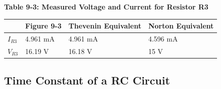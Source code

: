 \documentclass[a4paper]{article}
\begin{document}
\begin{center}
    \small\textbf{Table 9-3: Measured Voltage and Current for Resistor R3}
    \begin{tabular}{|p{3 cm}|p{3 cm}|p{3 cm}|p{3 cm}|}
        \hline
        & Figure 9-3 & Thevenin Equivalent & Norton Equivalent \\
        \hline
        $I_{R3}$ & 4.961 mA & 4.961 mA & 4.596 mA \\
        \hline
        $V_{R3}$ & 16.19 V & 16.18 V & 15 V\\
        \hline
    \end{tabular}
\end{center}
\pagebreak
\subsection{Time Constant of a RC Circuit}
\end{document}
